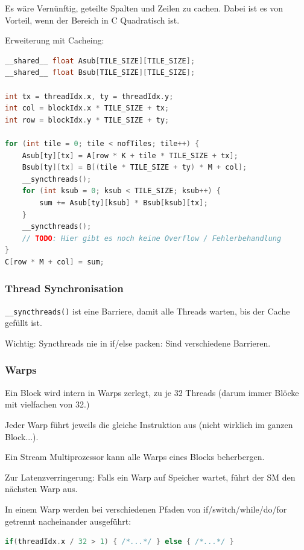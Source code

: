 Es wäre Vernünftig, geteilte Spalten und Zeilen zu cachen. Dabei ist es von Vorteil, wenn der Bereich in C Quadratisch ist.


Erweiterung mit Cacheing:

\begin{lstlisting}[language=C]
__shared__ float Asub[TILE_SIZE][TILE_SIZE];
__shared__ float Bsub[TILE_SIZE][TILE_SIZE];

int tx = threadIdx.x, ty = threadIdx.y;
int col = blockIdx.x * TILE_SIZE + tx;
int row = blockIdx.y * TILE_SIZE + ty;

for (int tile = 0; tile < nofTiles; tile++) {
	Asub[ty][tx] = A[row * K + tile * TILE_SIZE + tx];
	Bsub[ty][tx] = B[(tile * TILE_SIZE + ty) * M + col];
	__syncthreads();
	for (int ksub = 0; ksub < TILE_SIZE; ksub++) {
		sum += Asub[ty][ksub] * Bsub[ksub][tx];
	}
	__syncthreads();
	// TODO: Hier gibt es noch keine Overflow / Fehlerbehandlung
}
C[row * M + col] = sum;
\end{lstlisting}


\subsubsection{Thread Synchronisation}


\lstinline|__syncthreads()| ist eine Barriere, damit alle Threads warten, bis der Cache gefüllt ist.

Wichtig: Syncthreads nie in if/else packen: Sind verschiedene Barrieren.

\subsubsection{Warps}

Ein Block wird intern in Warps zerlegt, zu je 32 Threads (darum immer Blöcke mit vielfachen von 32.)

Jeder Warp führt jeweils die gleiche Instruktion aus (nicht wirklich im ganzen Block...).

Ein Stream Multiprozessor kann alle Warps eines Blocks beherbergen.

Zur Latenzverringerung: Falls ein Warp auf Speicher wartet, führt der SM den nächsten Warp aus.

In einem Warp werden bei verschiedenen Pfaden von if/switch/while/do/for getrennt nacheinander ausgeführt:
\begin{lstlisting}[language=C]
if(threadIdx.x / 32 > 1) { /*...*/ } else { /*...*/ } 
\end{lstlisting}



